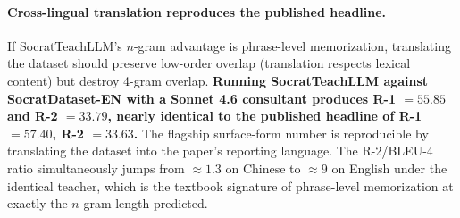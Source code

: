 \documentclass[11pt]{article}
\begin{document}
\begin{table}[t]
  \centering
  \small
  \caption{Same $10$ configurations, two leaderboards. SocratTeachLLM tops the surface-form ranking the published paper uses to claim victory, and falls to last on pedagogical state accuracy.}
  \label{tab:inversion}
\end{table}

\paragraph{Cross-lingual translation reproduces the published headline.} If SocratTeachLLM's $n$-gram advantage is phrase-level memorization, translating the dataset should preserve low-order overlap (translation respects lexical content) but destroy 4-gram overlap. \textbf{Running SocratTeachLLM against SocratDataset-EN with a Sonnet 4.6 consultant produces R-1 $=55.85$ and R-2 $=33.79$, nearly identical to the published headline of R-1 $=57.40$, R-2 $=33.63$.} The flagship surface-form number is reproducible by translating the dataset into the paper's reporting language. The R-2/BLEU-4 ratio simultaneously jumps from $\approx 1.3$ on Chinese to $\approx 9$ on English under the identical teacher, which is the textbook signature of phrase-level memorization at exactly the $n$-gram length predicted.
\end{document}
